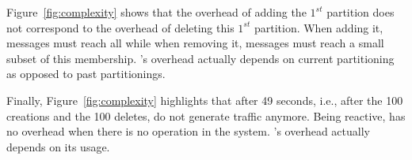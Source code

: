 \begin{asparadesc}
\noindent Figure~\ref{fig:complexity} shows that the overhead of
adding the $1^{st}$ partition does not correspond to the overhead of
deleting this $1^{st}$ partition. When adding it, messages must reach
all \processes while when removing it, messages must reach a small
subset of this membership.  \NAME's overhead actually depends on
current partitioning as opposed to past partitionings.

\noindent Finally, Figure~\ref{fig:complexity} highlights that after
49 seconds, i.e., after the 100 creations and the 100 deletes, \processes
do not generate traffic anymore. Being reactive, \NAME has no overhead 
when there is no operation in the system. \NAME's overhead actually
depends on its usage.

\end{asparadesc}



